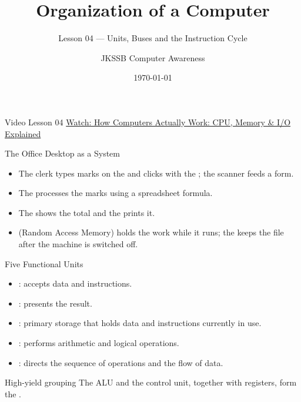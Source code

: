 \documentclass[aspectratio=169]{beamer}
\title{Organization of a Computer}
\subtitle{Lesson 04 --- Units, Buses and the Instruction Cycle}
\author{JKSSB Computer Awareness}
\date{\today}
\begin{document}
\frame{\titlepage}

\begin{frame}{Video Lesson 04}
  \centering
  \Large\href{https://youtu.be/92XQ_n1t_cc}{Watch: How Computers Actually Work: CPU, Memory \& I/O Explained}
\end{frame}

\begin{frame}{The Office Desktop as a System}
  \begin{itemize}
    \item The clerk types marks on the  and clicks with the
      ; the scanner feeds a form.
    \item The  processes the marks using a spreadsheet formula.
    \item The  shows the total and the  prints it.
    \item {} (Random Access Memory) holds the work while it runs; the
       keeps the file after the machine is switched off.
  \end{itemize}
  \vspace{0.3cm}
\end{frame}

\begin{frame}{Five Functional Units}
  \begin{itemize}
    \item {}: accepts data and instructions.
    \item {}: presents the result.
    \item {}: primary storage that holds data and instructions
      currently in use.
    \item {}: performs arithmetic and logical
      operations.
    \item {}: directs the sequence of operations and the flow
      of data.
  \end{itemize}
  \begin{block}{High-yield grouping}
    The ALU and the control unit, together with registers, form the
    .
  \end{block}
\end{frame}
\end{document}
